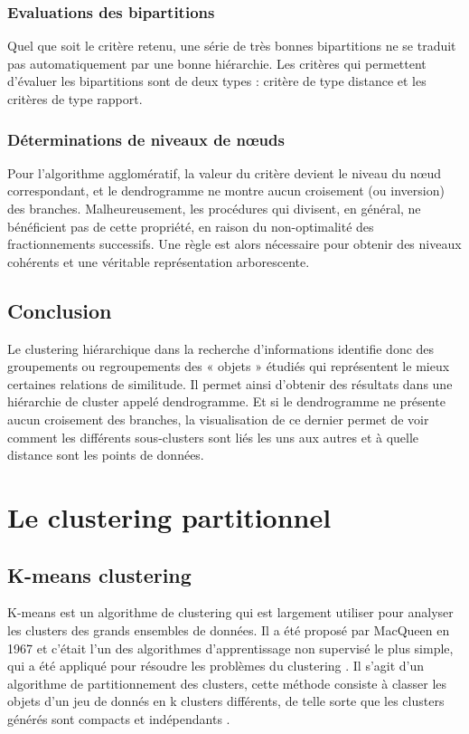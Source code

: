 \subsubsection{Evaluations des bipartitions}
Quel que soit le critère retenu, une série de très bonnes bipartitions ne se traduit pas automatiquement par une bonne hiérarchie.
Les critères qui permettent d’évaluer les bipartitions sont de deux types : critère de type distance et les critères de type rapport.

\subsubsection{Déterminations de niveaux de nœuds }
Pour l’algorithme agglomératif, la valeur du critère devient le niveau du nœud correspondant, et le dendrogramme ne montre aucun croisement (ou inversion) des branches.
Malheureusement, les procédures qui divisent, en général, ne bénéficient pas de cette propriété, en raison du non-optimalité des fractionnements successifs. Une règle est alors nécessaire pour obtenir des niveaux cohérents et une véritable représentation arborescente.

\subsection{Conclusion}
Le clustering hiérarchique dans la recherche d'informations identifie donc des groupements ou regroupements des « objets » étudiés qui représentent le mieux certaines relations de similitude. Il permet ainsi d’obtenir des résultats dans une hiérarchie de cluster appelé dendrogramme. Et si le dendrogramme ne présente aucun croisement des branches, la visualisation de ce dernier permet de voir comment les différents sous-clusters sont liés les uns aux autres et à quelle distance sont les points de données.
\section{Le clustering partitionnel}

\subsection{K-means clustering}
K-means est un algorithme de clustering qui est largement utiliser pour analyser les clusters des grands ensembles de données. Il a été proposé par MacQueen en 1967 et c’était l’un des algorithmes d’apprentissage non supervisé le plus simple, qui a été appliqué pour résoudre les problèmes du clustering \cite{sun2008clustering}. Il s'agit d'un algorithme de partitionnement des clusters, cette méthode consiste à classer les objets d’un jeu de donnés en k clusters différents, de telle sorte que les clusters générés sont compacts et indépendants \cite{na2010research}.

